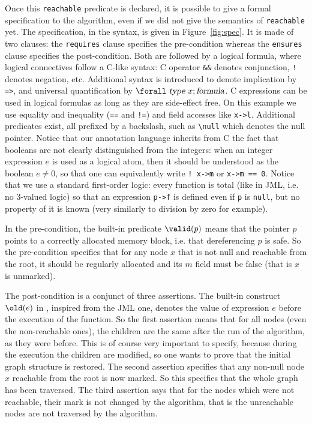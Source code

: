 Once this \texttt{reachable} predicate is declared, it is possible to
give a formal specification to the algorithm, even if we did not give
the semantics of \texttt{reachable} yet. The specification, in the
\caduceus{} syntax, is given in Figure~\ref{fig:spec}. It is made of
two clauses: the \texttt{requires} clause specifies the pre-condition
whereas the \texttt{ensures} clause specifies the post-condition. Both
are followed by a logical formula, where logical connectives follow a
C-like syntax: C operator \verb|&&| denotes conjunction, \verb|!|
denotes negation, etc. Additional syntax is introduced to denote
implication by \verb|=>|, and universal quantification by
$\bs{}\verb|forall|~\textsl{type}~x ; \textsl{formula}$. C expressions 
can be used in logical formulas as long as they are side-effect free. On this example we use equality and inequality (\verb|==| and
\verb|!=|) and field accesses like \verb|x->l|. Additional predicates
exist, all prefixed by a backslash, such as \verb|\null| which 
denotes the null pointer. Notice that our annotation language
inherits from C the fact that booleans are not clearly distinguished
from the integers: when an integer expression $e$ is used as a logical
atom, then it should be understood as the boolean $e\neq 0$, so that
one can equivalently write \verb|! x->m| or \verb|x->m == 0|. 
Notice that we use a standard first-order logic: every function is
total (like in JML, i.e. no 3-valued logic) so that an expression
\verb|p->f| is defined even if \verb|p| is \verb|null|, but no
property of it is known (very similarly to division by zero for
example). 

In the pre-condition, the built-in predicate $\valid(p)$ means that
the pointer $p$ points to a correctly allocated memory block, i.e. that
dereferencing $p$ is safe. So the pre-condition specifies that for any
node $x$ that is not null and reachable from the root, it should be
regularly allocated and its $m$ field must be false (that is $x$ is
unmarked).

The post-condition is a conjunct of three assertions. The built-in
construct $\old(e)$ in \caduceus{}, inspired from the JML one, denotes
the value of expression $e$ before the execution of the function. So
the first assertion means that for all nodes (even the non-reachable
ones), the children are the same after the run of the algorithm, as
they were before. This is of course very important to specify, because
during the execution the children are modified, so one wants to prove
that the initial graph structure is restored. The second
assertion specifies that any non-null node $x$ reachable from the
root is now marked. So this specifies that the whole 
graph has been traversed. The third assertion says that for the nodes
which were not reachable, their mark is not changed by the algorithm,
that is the unreachable nodes are not traversed by the algorithm.

